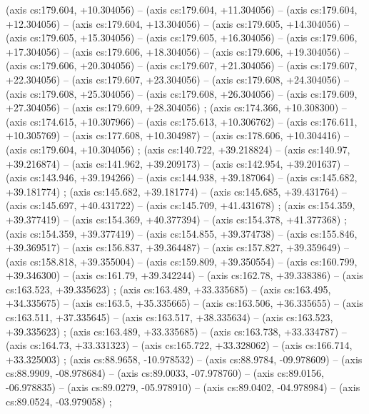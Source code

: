     (axis cs:179.604,    +10.304056) --  (axis cs:179.604,    +11.304056) --  (axis cs:179.604,    +12.304056) --  (axis cs:179.604,    +13.304056) --  (axis cs:179.605,    +14.304056) --  (axis cs:179.605,    +15.304056) --  (axis cs:179.605,    +16.304056) --  (axis cs:179.606,    +17.304056) --  (axis cs:179.606,    +18.304056) --  (axis cs:179.606,    +19.304056) --  (axis cs:179.606,    +20.304056) --  (axis cs:179.607,    +21.304056) --  (axis cs:179.607,    +22.304056) --  (axis cs:179.607,    +23.304056) --  (axis cs:179.608,    +24.304056) --  (axis cs:179.608,    +25.304056) --  (axis cs:179.608,    +26.304056) --  (axis cs:179.609,    +27.304056) --  (axis cs:179.609,    +28.304056) ;
    (axis cs:174.366,    +10.308300) --  (axis cs:174.615,    +10.307966) --  (axis cs:175.613,    +10.306762) --  (axis cs:176.611,    +10.305769) --  (axis cs:177.608,    +10.304987) --  (axis cs:178.606,    +10.304416) --  (axis cs:179.604,    +10.304056) ;
    (axis cs:140.722,    +39.218824) --  (axis cs:140.97,    +39.216874) --  (axis cs:141.962,    +39.209173) --  (axis cs:142.954,    +39.201637) --  (axis cs:143.946,    +39.194266) --  (axis cs:144.938,    +39.187064) --  (axis cs:145.682,    +39.181774) ;
    (axis cs:145.682,    +39.181774) --  (axis cs:145.685,    +39.431764) --  (axis cs:145.697,    +40.431722) --  (axis cs:145.709,    +41.431678) ;
    (axis cs:154.359,    +39.377419) --  (axis cs:154.369,    +40.377394) --  (axis cs:154.378,    +41.377368) ;
    (axis cs:154.359,    +39.377419) --  (axis cs:154.855,    +39.374738) --  (axis cs:155.846,    +39.369517) --  (axis cs:156.837,    +39.364487) --  (axis cs:157.827,    +39.359649) --  (axis cs:158.818,    +39.355004) --  (axis cs:159.809,    +39.350554) --  (axis cs:160.799,    +39.346300) --  (axis cs:161.79,    +39.342244) --  (axis cs:162.78,    +39.338386) --  (axis cs:163.523,    +39.335623) ;
    (axis cs:163.489,    +33.335685) --  (axis cs:163.495,    +34.335675) --  (axis cs:163.5,    +35.335665) --  (axis cs:163.506,    +36.335655) --  (axis cs:163.511,    +37.335645) --  (axis cs:163.517,    +38.335634) --  (axis cs:163.523,    +39.335623) ;
    (axis cs:163.489,    +33.335685) --  (axis cs:163.738,    +33.334787) --  (axis cs:164.73,    +33.331323) --  (axis cs:165.722,    +33.328062) --  (axis cs:166.714,    +33.325003) ;
    (axis cs:88.9658,    -10.978532) --  (axis cs:88.9784,    -09.978609) --  (axis cs:88.9909,    -08.978684) --  (axis cs:89.0033,    -07.978760) --  (axis cs:89.0156,    -06.978835) --  (axis cs:89.0279,    -05.978910) --  (axis cs:89.0402,    -04.978984) --  (axis cs:89.0524,    -03.979058) ;
